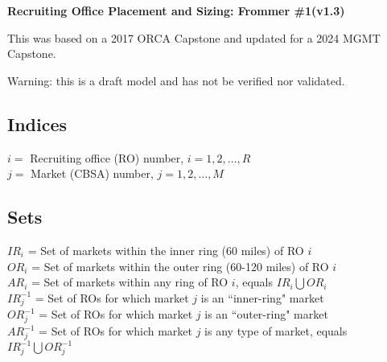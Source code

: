 \documentclass[11pt]{article}
\begin{document}
	
\begin{center}
	{\large\textbf{Recruiting Office Placement and Sizing:  Frommer \#1(v1.3)}}
\end{center}

This was based on a 2017 ORCA Capstone and updated for a 2024 MGMT Capstone.

Warning:  this is a draft model and has not be verified nor validated.

	\subsection*{Indices}
	$i = $ Recruiting office (RO) number, $i = 1, 2, ..., R$ \\
	$j = $ Market (CBSA) number, $j = 1, 2, ..., M$ \\

	\subsection*{Sets}
	$IR_i$ = Set of markets within the inner ring (60 miles) of RO $i$ \\
	$OR_i$ = Set of markets within the outer ring (60-120 miles) of RO $i$ \\
	$AR_i$ = Set of markets within any ring of RO $i$, equals $IR_i \bigcup OR_i$ \\
	$IR^{-1}_j$ = Set of ROs for which market $j$ is an ``inner-ring" market \\
	$OR^{-1}_j$ = Set of ROs for which market $j$ is an ``outer-ring" market \\
	$AR^{-1}_j$ = Set of ROs for which market $j$ is any type of market, equals $IR^{-1}_j \bigcup OR^{-1}_j$ \\
\end{document}
